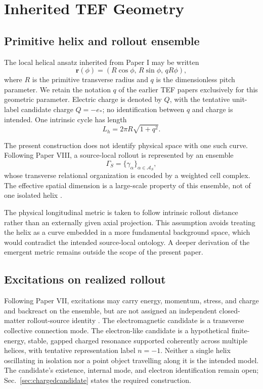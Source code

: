 \documentclass[11pt]{article}
\begin{document}
\section{Inherited TEF Geometry}

\subsection{Primitive helix and rollout ensemble}

The local helical ansatz inherited from Paper I may be written
\begin{equation}
\bm r(\phi)
=
\left(
R\cos\phi,\,
R\sin\phi,\,
qR\phi
\right),
\end{equation}
where $R$ is the primitive transverse radius and $q$ is the dimensionless pitch parameter. We retain the notation $q$ of the earlier TEF papers exclusively for this geometric parameter. Electric charge is denoted by $Q$, with the tentative unit-label candidate charge $Q=-e_*$; no identification between $q$ and charge is intended. One intrinsic cycle has length
\begin{equation}
L_h
=
2\pi R\sqrt{1+q^2}.
\end{equation}

The present construction does not identify physical space with one such curve. Following Paper VIII, a source-local rollout is represented by an ensemble
\begin{equation}
\Gamma_S
=
\{\gamma_\alpha\}_{\alpha\in\mathcal A_S},
\end{equation}
whose transverse relational organization is encoded by a weighted cell complex. The effective spatial dimension is a large-scale property of this ensemble, not of one isolated helix \cite{wu2026geometry}.

The physical longitudinal metric is taken to follow intrinsic rollout distance rather than an externally given axial projection. This assumption avoids treating the helix as a curve embedded in a more fundamental background space, which would contradict the intended source-local ontology. A deeper derivation of the emergent metric remains outside the scope of the present paper.

\subsection{Excitations on realized rollout}

Following Paper VII, excitations may carry energy, momentum, stress, and charge and backreact on the ensemble, but are not assigned an independent closed-matter rollout-source identity \cite{wu2026minimal}. The electromagnetic candidate is a transverse collective connection mode. The electron-like candidate is a hypothetical finite-energy, stable, gapped charged resonance supported coherently across multiple helices, with tentative representation label $n=-1$. Neither a single helix oscillating in isolation nor a point object travelling along it is the intended model. The candidate's existence, internal mode, and electron identification remain open; Sec.~\ref{sec:chargedcandidate} states the required construction.
\end{document}
